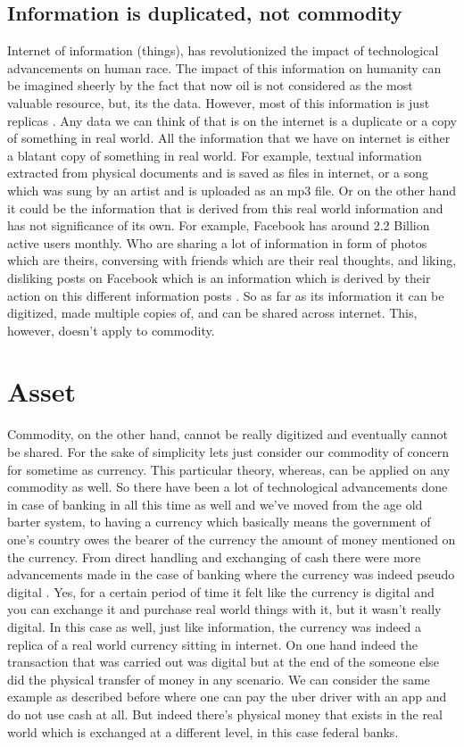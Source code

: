 \subsection{Information is duplicated, not commodity}

Internet of information (things), has revolutionized the impact of technological advancements on human race. The impact of this information on humanity can be imagined sheerly by the fact that now oil is not considered as the most valuable resource, but, its the data. However, most of this information is just replicas \cite{economist5}. Any data we can think of that is on the internet is a duplicate or a copy of something in real world. All the information that we have on internet is either a blatant copy of something in real world. For example, textual information extracted from physical documents and is saved as files in internet, or a song which was sung by an artist and is uploaded as an mp3 file. Or on the other hand it could be the information that is derived from this real world information and has not significance of its own. For example, Facebook has around 2.2 Billion active users monthly. Who are sharing a lot of information in form of photos which are theirs, conversing with friends which are their real thoughts, and liking, disliking posts on Facebook which is an information which is derived by their action on this different information posts \cite{statista6}. So as far as its information it can be digitized, made multiple copies of, and can be shared across internet. This, however, doesn't apply to commodity.

\section{Asset}
Commodity, on the other hand, cannot be really digitized and eventually cannot be shared. For the sake of simplicity lets just consider our commodity of concern for sometime as currency. This particular theory, whereas, can be applied on any commodity as well. So there have been a lot of technological advancements done in case of banking in all this time as well and we've moved from the age old barter system, to having a currency which basically means the government of one's country owes the bearer of the currency the amount of money mentioned on the currency. From direct handling and exchanging of cash there were more advancements made in the case of banking where the currency was indeed pseudo digital \cite{Chen7}. Yes, for a certain period of time it felt like the currency is digital and you can exchange it and purchase real world things with it, but it wasn't really digital. In this case as well, just like information, the currency was indeed a replica of a real world currency sitting in internet. On one hand indeed the transaction that was carried out was digital but at the end of the someone else did the physical transfer of money in any scenario. We can consider the same example as described before where one can pay the uber driver with an app and do not use cash at all. But indeed there's physical money that exists in the real world which is exchanged at a different level, in this case federal banks.

